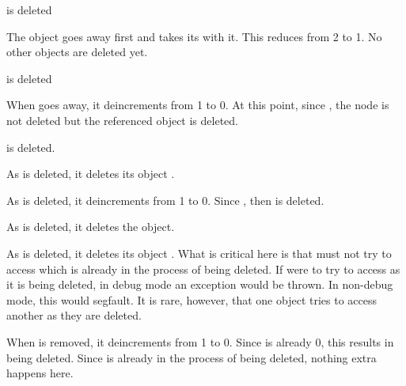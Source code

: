 \documentclass[pdf,ps2pdf,11pt]{SANDreport}
\begin{document}
\begin{description}

{}\item[a)] {} is deleted

  \begin{description}

  {}\item[a.1)] The {} object goes away first and takes
  its {} {} with it.  This reduces
  {} from 2 to 1.  No other objects are
  deleted yet.

  \end{description}

{}\item[b)] {} is deleted

  \begin{description}

  {}\item[b.1)] When {} goes away, it deincrements
  {} from 1 to 0.  At this point, since
  {}, the node is not deleted but the
  referenced object {} is deleted.

  {}\item[b.2)] {} is deleted.

  {}\item[b.3)] As {} is deleted, it deletes its
  {} object {}.

  {}\item[b.4)] As {} is deleted, it deincrements
  {} from 1 to 0. Since
  {}, then {} is deleted.

  {}\item[b.5)] As {} is deleted, it deletes the
  {} object.

  {}\item[b.6)] As {} is deleted, it deletes its
  {} object {}.  What is critical here is
  that {} must not try to access {} which is
  already in the process of being deleted.  If {} were to
  try to access {} as it is being deleted, in debug mode an
  exception would be thrown.  In non-debug mode, this would segfault.
  It is rare, however, that one object tries to access another as they
  are deleted.

  {}\item[b.7)] When {} is removed, it deincrements
  {} from 1 to 0.  Since
  {} is already 0, this results in
  {} being deleted.  Since {} is already in
  the process of being deleted, nothing extra happens here.

  \end{description}

\end{description}
\end{document}
